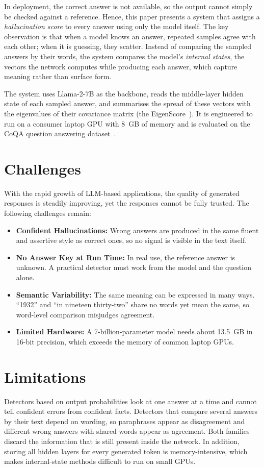 \documentclass[journal]{IEEEtran}
\begin{document}
In deployment, the correct answer is not available, so the output cannot simply be checked against a reference. Hence, this paper presents a system that assigns a \emph{hallucination score} to every answer using only the model itself. The key observation is that when a model knows an answer, repeated samples agree with each other; when it is guessing, they scatter. Instead of comparing the sampled answers by their words, the system compares the model's \emph{internal states}, the vectors the network computes while producing each answer, which capture meaning rather than surface form.

The system uses Llama-2-7B as the backbone, reads the middle-layer hidden state of each sampled answer, and summarises the spread of these vectors with the eigenvalues of their covariance matrix (the EigenScore~\cite{chen2024inside}). It is engineered to run on a consumer laptop GPU with 8~GB of memory and is evaluated on the CoQA question answering dataset~\cite{reddy2019coqa}.

\section{Challenges}
With the rapid growth of LLM-based applications, the quality of generated responses is steadily improving, yet the responses cannot be fully trusted. The following challenges remain:
\begin{itemize}
\item \textbf{Confident Hallucinations:} Wrong answers are produced in the same fluent and assertive style as correct ones, so no signal is visible in the text itself.
\item \textbf{No Answer Key at Run Time:} In real use, the reference answer is unknown. A practical detector must work from the model and the question alone.
\item \textbf{Semantic Variability:} The same meaning can be expressed in many ways. ``1932'' and ``in nineteen thirty-two'' share no words yet mean the same, so word-level comparison misjudges agreement.
\item \textbf{Limited Hardware:} A 7-billion-parameter model needs about 13.5~GB in 16-bit precision, which exceeds the memory of common laptop GPUs.
\end{itemize}

\section{Limitations}
Detectors based on output probabilities look at one answer at a time and cannot tell confident errors from confident facts. Detectors that compare several answers by their text depend on wording, so paraphrases appear as disagreement and different wrong answers with shared words appear as agreement. Both families discard the information that is still present inside the network. In addition, storing all hidden layers for every generated token is memory-intensive, which makes internal-state methods difficult to run on small GPUs.
\end{document}
